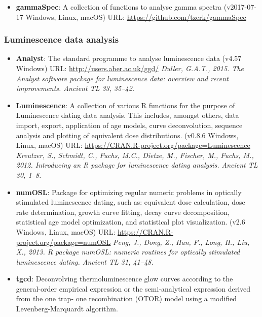 \documentclass[]{article}
\providecommand{\tightlist}{%
  \setlength{\itemsep}{0pt}\setlength{\parskip}{0pt}}
\begin{document}
\begin{itemize}
\tightlist
\item
  \textbf{gammaSpec}: A collection of functions to analyse gamma spectra
  (v2017-07-17 \textbar{} Windows, Linux, macOS)
  URL: \url{https://github.com/tzerk/gammaSpec}
\end{itemize}

\hypertarget{luminescence-data-analysis}{%
\subsubsection{Luminescence data analysis}\label{luminescence-data-analysis}}

\begin{itemize}
\tightlist
\item
  \textbf{Analyst}: The standard programme to analyse luminescence data
  (v4.57 \textbar{} Windows)
  URL: \url{http://users.aber.ac.uk/ggd/}
  \emph{Duller, G.A.T., 2015. The Analyst software package for luminescence data: overview and recent improvements. Ancient TL 33, 35--42.}
\item
  \textbf{Luminescence}: A collection of various R functions for the purpose of Luminescence
  dating data analysis. This includes, amongst others, data import, export,
  application of age models, curve deconvolution, sequence analysis and
  plotting of equivalent dose distributions.
  (v0.8.6 \textbar{} Windows, Linux, macOS)
  URL: \url{https://CRAN.R-project.org/package=Luminescence}
  \emph{Kreutzer, S., Schmidt, C., Fuchs, M.C., Dietze, M., Fischer, M., Fuchs, M., 2012. Introducing an R package for luminescence dating analysis. Ancient TL 30, 1--8.}
\item
  \textbf{numOSL}: Package for optimizing regular numeric problems in optically stimulated luminescence
  dating, such as: equivalent dose calculation, dose rate determination, growth curve fitting,
  decay curve decomposition, statistical age model optimization, and statistical plot visualization.
  (v2.6 \textbar{} Windows, Linux, macOS)
  URL: \url{https://CRAN.R-project.org/package=numOSL}
  \emph{Peng, J., Dong, Z., Han, F., Long, H., Liu, X., 2013. R package numOSL: numeric routines for optically stimulated luminescence dating. Ancient TL 31, 41--48.}
\item
  \textbf{tgcd}: Deconvolving thermoluminescence glow curves according to the general-order
  empirical expression or the semi-analytical expression derived from the one trap-
  one recombination (OTOR) model using a modified Levenberg-Marquardt algorithm.

\end{itemize}
\end{document}
